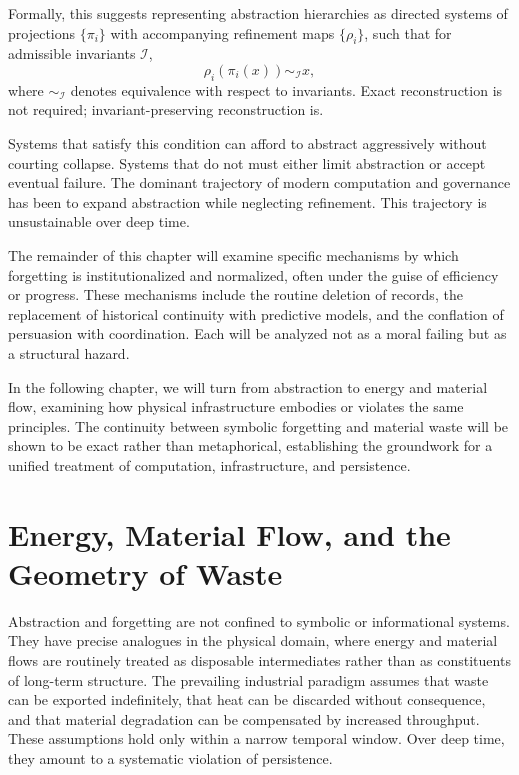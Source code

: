 \documentclass[12pt,oneside]{book}
\begin{document}
Formally, this suggests representing abstraction hierarchies as directed systems of projections \(\{\pi_i\}\) with accompanying refinement maps \(\{\rho_i\}\), such that for admissible invariants \(\mathcal{I}\),
\[
\rho_i(\pi_i(x)) \sim_{\mathcal{I}} x,
\]
where \(\sim_{\mathcal{I}}\) denotes equivalence with respect to invariants. Exact reconstruction is not required; invariant-preserving reconstruction is.

Systems that satisfy this condition can afford to abstract aggressively without courting collapse. Systems that do not must either limit abstraction or accept eventual failure. The dominant trajectory of modern computation and governance has been to expand abstraction while neglecting refinement. This trajectory is unsustainable over deep time.

The remainder of this chapter will examine specific mechanisms by which forgetting is institutionalized and normalized, often under the guise of efficiency or progress. These mechanisms include the routine deletion of records, the replacement of historical continuity with predictive models, and the conflation of persuasion with coordination. Each will be analyzed not as a moral failing but as a structural hazard.

In the following chapter, we will turn from abstraction to energy and material flow, examining how physical infrastructure embodies or violates the same principles. The continuity between symbolic forgetting and material waste will be shown to be exact rather than metaphorical, establishing the groundwork for a unified treatment of computation, infrastructure, and persistence.

\chapter{Energy, Material Flow, and the Geometry of Waste}

Abstraction and forgetting are not confined to symbolic or informational systems. They have precise analogues in the physical domain, where energy and material flows are routinely treated as disposable intermediates rather than as constituents of long-term structure. The prevailing industrial paradigm assumes that waste can be exported indefinitely, that heat can be discarded without consequence, and that material degradation can be compensated by increased throughput. These assumptions hold only within a narrow temporal window. Over deep time, they amount to a systematic violation of persistence.
\end{document}
